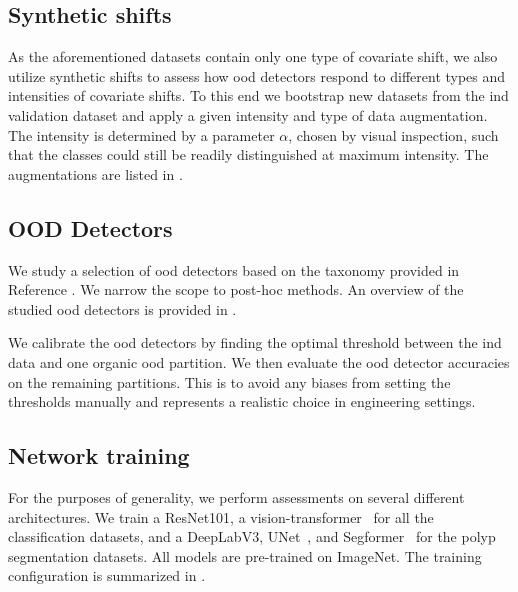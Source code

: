 \documentclass[10pt,twocolumn,letterpaper]{article}
\begin{document}
\subsection{Synthetic shifts}
As the aforementioned datasets contain only one type of covariate shift, we also utilize synthetic shifts to assess how \gls{ood} detectors respond to different types and intensities of covariate shifts. To this end we bootstrap new datasets from the \gls{ind} validation dataset and apply a given intensity and type of data augmentation. The intensity is determined by a parameter \(\alpha\), chosen by visual inspection, such that the classes could still be readily distinguished at maximum intensity. The augmentations are listed in . 
\begin{table}
    \centering
    \caption{Overview of synthetic augmentations.}
    
    \label{tab:aug_table}
\end{table}
\subsection{OOD Detectors}
We study a selection of \gls{ood} detectors based on the taxonomy provided in Reference \cite{dsd_survey}. We narrow the scope to post-hoc methods. An overview of the studied \gls{ood} detectors is provided in .
\begin{table}[!htb]
    \centering
    \caption{Overview of OoD detectors.}
    
    \label{tab:ood_detector_table}
\end{table}
We calibrate the \gls{ood} detectors by finding the optimal threshold between the \gls{ind} data and one organic \gls{ood} partition. We then evaluate the \gls{ood} detector accuracies on the remaining partitions. This is to avoid any biases from setting the thresholds manually and represents a realistic choice in engineering settings. 

\subsection{Network training}
For the purposes of generality, we perform assessments on several different architectures. We train a ResNet101\cite{resnet}, a vision-transformer~\cite{vit} for all the classification datasets, and a DeepLabV3, UNet~\cite{unet}, and Segformer~\cite{segformer} for the polyp segmentation datasets. All models are pre-trained on ImageNet. The training configuration is summarized in .
\begin{table}[!htb]
    \centering
    \caption{Overview of Training Method.}
    
    \label{tab:training_table}
\end{table}
\end{document}
